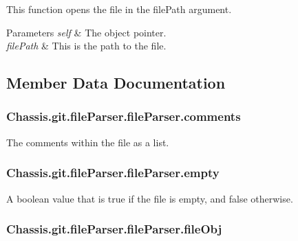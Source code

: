 This function opens the file in the file\-Path argument. 


\begin{DoxyParams}{Parameters}
{\em self} & The object pointer. \\
\hline
{\em file\-Path} & This is the path to the file. \\
\hline
\end{DoxyParams}


\subsection{Member Data Documentation}
\hypertarget{class_chassis_8git_1_1file_parser_1_1file_parser_a0fe55989374700f448b8b931665016b8}{
\subsubsection[{comments}]{\setlength{\rightskip}{0pt plus 5cm}Chassis.\-git.\-file\-Parser.\-file\-Parser.\-comments}}\label{class_chassis_8git_1_1file_parser_1_1file_parser_a0fe55989374700f448b8b931665016b8}


The comments within the file as a list. 

\hypertarget{class_chassis_8git_1_1file_parser_1_1file_parser_af6c4654848127445265b91e10393b302}{
\subsubsection[{empty}]{\setlength{\rightskip}{0pt plus 5cm}Chassis.\-git.\-file\-Parser.\-file\-Parser.\-empty}}\label{class_chassis_8git_1_1file_parser_1_1file_parser_af6c4654848127445265b91e10393b302}


A boolean value that is true if the file is empty, and false otherwise. 

\hypertarget{class_chassis_8git_1_1file_parser_1_1file_parser_afed07b7aef64bcf14e3f5dfbfb8abdad}{
\subsubsection[{file\-Obj}]{\setlength{\rightskip}{0pt plus 5cm}Chassis.\-git.\-file\-Parser.\-file\-Parser.\-file\-Obj}}\label{class_chassis_8git_1_1file_parser_1_1file_parser_afed07b7aef64bcf14e3f5dfbfb8abdad}


